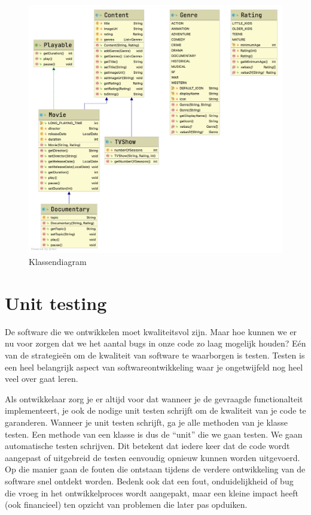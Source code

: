 \documentclass{tstextbook}
\begin{document}
\begin{figure}[H]
  \includegraphics[width=\linewidth]{images/h1/klassendiagram_final.png}
  \caption{Klassendiagram}
  \label{fig:klassendiagram}
\end{figure}


\chapter{Unit testing}

\begin{summary}
De software die we ontwikkelen moet kwaliteitsvol zijn. Maar hoe kunnen we er nu voor zorgen dat we het aantal bugs in onze code zo laag mogelijk houden? E\'en van de strategie\"en om de kwaliteit van software te waarborgen is testen. Testen is een heel belangrijk aspect van softwareontwikkeling waar je ongetwijfeld nog heel veel over gaat leren. 

Als ontwikkelaar zorg je er altijd voor dat wanneer je de gevraagde functionalteit implementeert, je ook de nodige unit testen schrijft om de kwaliteit van je code te garanderen. Wanneer je unit testen schrijft, ga je alle methoden van je klasse testen. Een methode van een klasse is dus de ``unit'' die we gaan testen.
We gaan automatische testen schrijven. Dit betekent dat iedere keer dat de code wordt aangepast of uitgebreid de testen eenvoudig opnieuw kunnen worden uitgevoerd. Op die manier gaan de fouten die ontstaan tijdens de verdere ontwikkeling van de software snel ontdekt worden. Bedenk ook dat een fout, onduidelijkheid of bug die vroeg in het ontwikkelproces wordt aangepakt, maar een kleine impact heeft (ook financieel) ten opzicht van problemen die later pas opduiken.
\end{summary}
\end{document}
